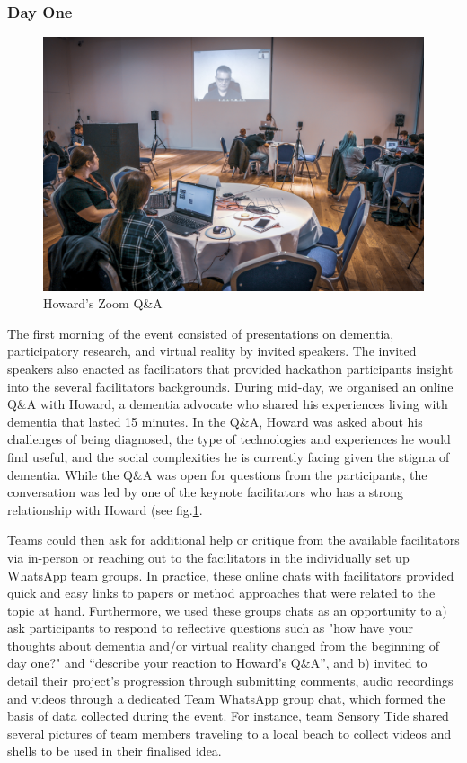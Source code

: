\subsubsection{Day One}
\label{DayOne}

\begin{figure}[htp]
\centering
\includegraphics[width=.8\linewidth]{Images/DemVR/Howard.jpg}
\caption{Howard's Zoom Q\&A}
\label{fig:Howard}
\end{figure}
The first morning of the event consisted of presentations on dementia, participatory research, and virtual reality by invited speakers. The invited speakers also enacted as facilitators that provided hackathon participants insight into the several facilitators backgrounds. During mid-day, we organised an online Q\&A with Howard, a dementia advocate who shared his experiences living with dementia that lasted 15 minutes. In the Q\&A, Howard was asked about his challenges of being diagnosed, the type of technologies and experiences he would find useful, and the social complexities he is currently facing given the stigma of dementia. While the Q\&A was open for questions from the participants, the conversation was led by one of the keynote facilitators who has a strong relationship with Howard (see fig.\ref{fig:Howard}. 

Teams could then ask for additional help or critique from the available facilitators via in-person or reaching out to the facilitators in the individually set up WhatsApp team groups. In practice, these online chats with facilitators provided quick and easy links to papers or method approaches that were related to the topic at hand. Furthermore, we used these groups chats as an opportunity to a) ask participants to respond to reflective questions such as "how have your thoughts about dementia and/or virtual reality changed from the beginning of day one?" and “describe your reaction to Howard’s Q\&A”, and b) invited to detail their project’s progression through submitting comments, audio recordings and videos through a dedicated Team WhatsApp group chat, which formed the basis of data collected during the event. For instance, team Sensory Tide shared several pictures of team members traveling to a local beach to collect videos and shells to be used in their finalised idea.

